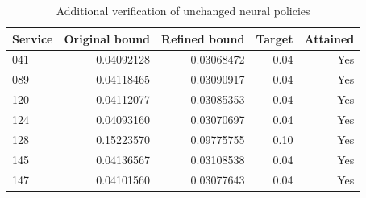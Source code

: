 \begin{table}[htbp]
\centering\small
\caption{Additional verification of unchanged neural policies}
\label{tab:recertification}
\begin{tabular}{lrrrr}
\toprule
Service & Original bound & Refined bound & Target & Attained\\
\midrule
041 & 0.04092128 & 0.03068472 & 0.04 & Yes\\
089 & 0.04118465 & 0.03090917 & 0.04 & Yes\\
120 & 0.04112077 & 0.03085353 & 0.04 & Yes\\
124 & 0.04093160 & 0.03070697 & 0.04 & Yes\\
128 & 0.15223570 & 0.09775755 & 0.10 & Yes\\
145 & 0.04136567 & 0.03108538 & 0.04 & Yes\\
147 & 0.04101560 & 0.03077643 & 0.04 & Yes\\
\bottomrule
\end{tabular}
\end{table}
